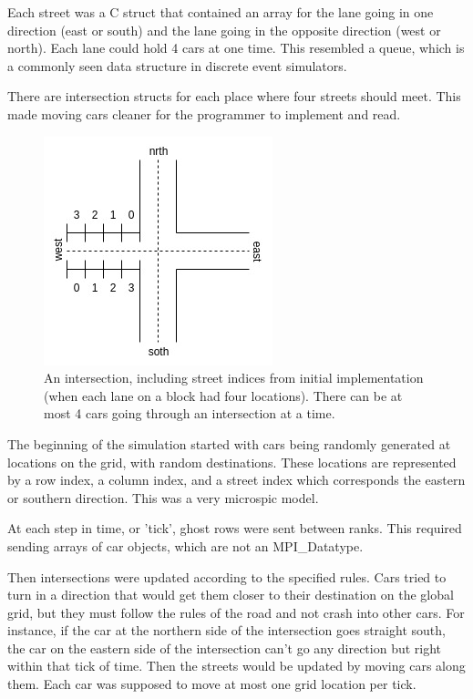 \documentclass[10pt,a4paper]{article}
\begin{document}
Each street was a C struct that contained an array for the lane going in one direction (east or south) and the lane going in the opposite direction (west or north). Each lane could hold 4 cars at one time. This resembled a queue, which is a commonly seen data structure in discrete event simulators.

There are intersection structs for each place where four streets should meet. This made moving cars cleaner for the programmer to implement and read.

\begin{figure}
    \centering
    \includegraphics[scale=0.6]{parallel2.jpg}
    \caption{An intersection, including street indices from initial implementation (when each lane on a block had four locations). There can be at most 4 cars going through an intersection at a time.}
    \label{fig:my_label}
\end{figure}

The beginning of the simulation started with cars being randomly generated at locations on the grid, with random destinations. These locations are represented by a row index, a column index, and a street index which corresponds the eastern or southern direction. This was a very microspic model. 

At each step in time, or 'tick', ghost rows were sent between ranks. This required sending arrays of car objects, which are not an MPI\_Datatype.

Then intersections were updated according to the specified rules. Cars tried to turn in a direction that would get them closer to their destination on the global grid, but they must follow the rules of the road and not crash into other cars. For instance, if the car at the northern side of the intersection goes straight south, the car on the eastern side of the intersection can't go any direction but right within that tick of time. Then the streets would be updated by moving cars along them. Each car was supposed to move at most one grid location per tick.
\end{document}
